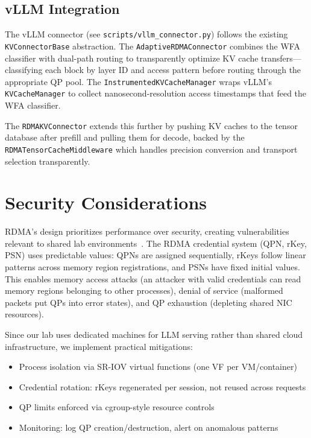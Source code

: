 \documentclass[11pt,letterpaper]{article}
\theoremstyle{definition}
\begin{document}
\subsection{vLLM Integration}

The vLLM connector (see \texttt{scripts/vllm\_connector.py}) follows the existing \texttt{KVConnectorBase} abstraction. The \texttt{AdaptiveRDMAConnector} combines the WFA classifier with dual-path routing to transparently optimize KV cache transfers---classifying each block by layer ID and access pattern before routing through the appropriate QP pool. The \texttt{InstrumentedKVCacheManager} wraps vLLM's \texttt{KVCacheManager} to collect nanosecond-resolution access timestamps that feed the WFA classifier.

The \texttt{RDMAKVConnector} extends this further by pushing KV caches to the tensor database after prefill and pulling them for decode, backed by the \texttt{RDMATensorCacheMiddleware} which handles precision conversion and transport selection transparently.

\section{Security Considerations}
\label{sec:security}

RDMA's design prioritizes performance over security, creating vulnerabilities relevant to shared lab environments~\cite{bedrock2022, redmark2021}. The RDMA credential system (QPN, rKey, PSN) uses predictable values: QPNs are assigned sequentially, rKeys follow linear patterns across memory region registrations, and PSNs have fixed initial values. This enables memory access attacks (an attacker with valid credentials can read memory regions belonging to other processes), denial of service (malformed packets put QPs into error states), and QP exhaustion (depleting shared NIC resources).

Since our lab uses dedicated machines for LLM serving rather than shared cloud infrastructure, we implement practical mitigations:
\begin{itemize}[nosep]
    \item Process isolation via SR-IOV virtual functions (one VF per VM/container)
    \item Credential rotation: rKeys regenerated per session, not reused across requests
    \item QP limits enforced via cgroup-style resource controls
    \item Monitoring: log QP creation/destruction, alert on anomalous patterns
\end{itemize}
\end{document}
